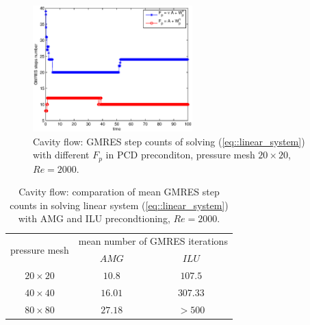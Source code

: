 \documentclass{eajam}
\begin{document}
       \begin{figure}[!htbp]
         \begin{center}
           \includegraphics[width = 0.55\textwidth, angle = 0]{picture/cavity_flow_data/Fp_comparation_mesh20.eps}
        \end{center}
        \caption{\small Cavity flow: GMRES step counts of solving
          (\ref{eq::linear_system}) with different $F_p$ in PCD preconditon,
          pressure mesh $20 \times 20$, $Re = 2000$.}
        \label{fig::cavity_compare_Fp}
       \end{figure}
       
       \begin{table}[!htbp]
         \centering
         \begin{tabular}{ccc}
           \toprule
           \multirow{2}{*}{pressure mesh}  & \multicolumn{2}{c}{mean
             number of GMRES iterations} \\
           \cline{2-3}
                           & $AMG$ & $ILU$ \\ \midrule
           $20 \times 20$   &      $10.8$           &     $107.5$
           \\ \midrule
           $40 \times 40$   &      $16.01$             &     $307.33$
           \\ \midrule       
           $80 \times 80$   &     $27.18$              &     $>500$
           \\ \bottomrule 
         \end{tabular}
         \caption{Cavity flow: comparation of mean GMRES step counts in solving linear system
           (\ref{eq::linear_system}) with AMG and ILU precondtioning, $Re = 2000$.}
         \label{tab::comparation_GMRES_steps}
       \end{table}
\end{document}

